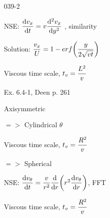 \begin{mitframe}{039-2}

        
\begin{listone}

\item NSE: $\dfrac{\mathrm{d}\vvel_{\disp}}{\mathrm{d}t}=\vvel\dfrac{\mathrm{d}^2\vvel_{\disp}}{\mathrm{d}y^2}$ , similarity
			\begin{listtwo}
            \item Solution: $\dfrac{\vvel_{\disp}}{\uvel}=1-\e\pos\fug\bigg(\dfrac{y}{2\sqrt{\vvel{t}}}\bigg)$
            \item Viscous time scale, $t_{\vvel}=\dfrac{\length^2}{\vvel}$
            
           \item Ex. 6.4-1, Deen p. 261

\end{listtwo}

\item Axisymmetric

\item $=>$ Cylindrical $\theta$

			\begin{listtwo}
            
            \item Viscous time scale, $t_{\vvel}=\dfrac{\gasconst^2}{\vvel}$
            
\end{listtwo}

\item $=>$ Spherical

\item NSE: $ \dfrac{\mathrm{d}\vvel_{\theta}}{\mathrm{d}t}=\dfrac{\vvel}{\pos^2}\dfrac{\mathrm{d}}{\mathrm{d}\pos}\bigg(\pos^2\dfrac{\mathrm{d}\vvel_{\theta}}{\mathrm{d}\pos}\bigg)$, FFT

			\begin{listtwo}
            
            \item Viscous time scale, $t_{\vvel}=\dfrac{\gasconst^2}{\vvel}$

\end{listtwo}

\end{listone}
\end{mitframe}